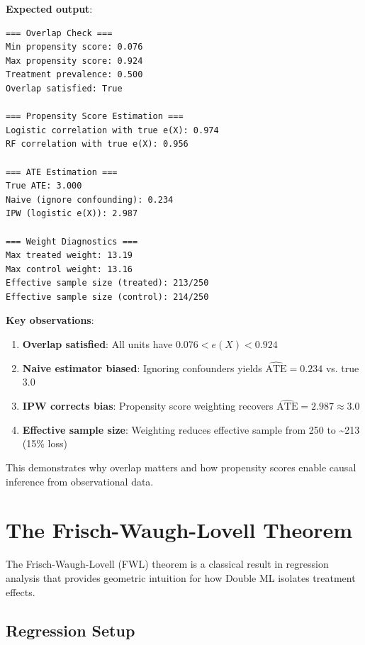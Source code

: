 \textbf{Expected output}:

\begin{verbatim}
=== Overlap Check ===
Min propensity score: 0.076
Max propensity score: 0.924
Treatment prevalence: 0.500
Overlap satisfied: True

=== Propensity Score Estimation ===
Logistic correlation with true e(X): 0.974
RF correlation with true e(X): 0.956

=== ATE Estimation ===
True ATE: 3.000
Naive (ignore confounding): 0.234
IPW (logistic e(X)): 2.987

=== Weight Diagnostics ===
Max treated weight: 13.19
Max control weight: 13.16
Effective sample size (treated): 213/250
Effective sample size (control): 214/250
\end{verbatim}

\textbf{Key observations}:

\begin{enumerate}
\def\labelenumi{\arabic{enumi}.}
\item
  \textbf{Overlap satisfied}: All units have \(0.076 < e(X) < 0.924\)
\item
  \textbf{Naive estimator biased}: Ignoring confounders yields
  \(\hat{\text{ATE}} = 0.234\) vs. true 3.0
\item
  \textbf{IPW corrects bias}: Propensity score weighting recovers
  \(\hat{\text{ATE}} = 2.987 \approx 3.0\)
\item
  \textbf{Effective sample size}: Weighting reduces effective sample
  from 250 to \textasciitilde213 (15\% loss)
\end{enumerate}

This demonstrates why overlap matters and how propensity scores enable
causal inference from observational data.

\section{The Frisch-Waugh-Lovell
Theorem}\label{_the_frisch_waugh_lovell_theorem}

The Frisch-Waugh-Lovell (FWL) theorem
\cite{frisch1933partial,lovell1963seasonal} is a classical result in
regression analysis that provides geometric intuition for how Double ML
isolates treatment effects.

\subsection{Regression Setup}\label{_regression_setup}

